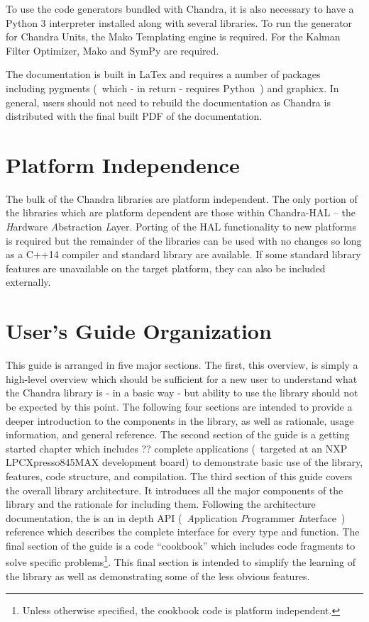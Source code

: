 \documentclass[10pt,letterpaper]{memoir} %
\begin{document}
To use the code generators bundled with Chandra, it is also necessary to have a Python 3 interpreter installed along with several libraries.  To run the generator for Chandra Units, the Mako Templating engine is required.  For the Kalman Filter Optimizer, Mako and SymPy are required.

The documentation is built in LaTex and requires a number of packages including pygments (~which - in return - requires Python~) and graphicx.  In general, users should not need to rebuild the documentation as Chandra is distributed with the final built PDF of the documentation.
 
\section{Platform Independence}
The bulk of the Chandra libraries are platform independent.  The only portion of the libraries which are platform dependent are those within Chandra-HAL -- the \emph{H}ardware \emph{A}bstraction \emph{L}ayer.  Porting of the HAL functionality to new platforms is required but the remainder of the libraries can be used with no changes so long as a C++14 compiler and standard library are available.  If some standard library features are unavailable on the target platform, they can also be included externally.

\section{User's Guide Organization}
This guide is arranged in five major sections.  The first, this overview, is simply a high-level overview which should be sufficient for a new user to understand what the Chandra library is - in a basic way - but ability to use the library should not be expected by this point.  The following four sections are intended to provide a deeper introduction to the components in the library, as well as rationale, usage information, and general reference.  The second section of the guide is a getting started chapter which includes ?? complete applications (~targeted at an NXP LPCXpresso845MAX development board) to demonstrate basic use of the library, features, code structure, and compilation.  The third section of this guide covers the overall library architecture.  It introduces all the major components of the library and the rationale for including them.  Following the architecture documentation, the is an in depth API (~\emph{A}pplication \emph{P}rogrammer \emph{I}nterface~) reference which describes the complete interface for every type and function.  The final section of the guide is a code ``cookbook'' which includes code fragments to solve specific problems\footnote{Unless otherwise specified, the cookbook code is platform independent.}.  This final section is intended to simplify the learning of the library as well as demonstrating some of the less obvious features.
\end{document}

